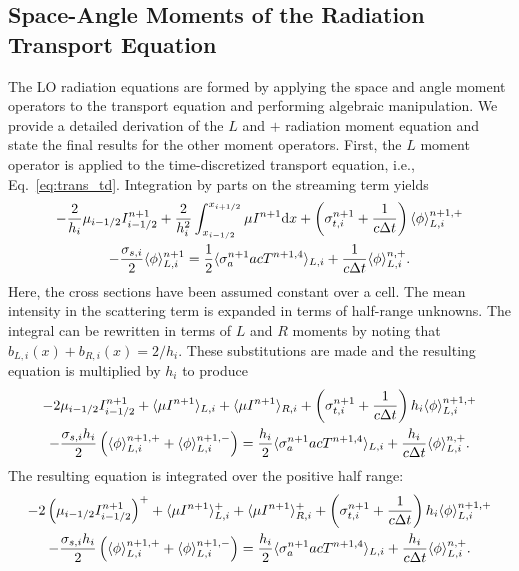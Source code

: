 \subsection{Space-Angle Moments of the Radiation Transport Equation}

The LO radiation equations are formed by applying the space and angle moment operators to the
transport equation and performing algebraic manipulation.  We provide a detailed
derivation of the $L$ and $+$ radiation moment equation and state the final results for the
other moment operators.  First, the $L$ moment operator is applied to the time-discretized transport equation,
i.e., Eq.~\eqref{eq:trans_td}.  Integration by parts on the streaming term yields
\begin{multline}
    -\frac{2}{h_i}{\mu}_{i-1/2} I_{i-1/2}^{n+1} + \frac{2}{h_i^2}\int_{{x_{i-1/2}}}^{{x_{i+1/2}}} \mu I^{n+1} \mathrm{d} x
        +  \left(\sigma_{t,i}^{n+1}+\frac{1}{c \Delta t} \right)  
        \langle \phi \rangle_{L,i}^{n+1,+} \\-  \frac{\sigma_{s,i} }{2} \langle \phi \rangle_{L,i}^{n+1} =
        \frac{1}{2} \langle \sigma_a^{n+1} a c T^{n+1,4} \rangle_{L,i} +
  \frac{1}{c\Delta t}\langle \phi \rangle_{L,i}^{n,+}.
\end{multline}
Here, the cross sections have been assumed constant over a cell.  The mean
intensity in the scattering term is expanded in terms of half-range unknowns.
The integral can be rewritten in terms of $L$ and $R$ moments by noting that $b_{L,i}(x) +
b_{R,i}(x) = 2/h_i$.  These substitutions are made and the resulting equation is
multiplied by $h_i$ to produce
\begin{multline}
    -2{\mu}_{i-1/2} I_{i-1/2}^{n+1} + \langle \mu I^{n+1} \rangle_{L,i} + \langle \mu I^{n+1} \rangle_{R,i} 
        +  \left(\sigma_{t,i}^{n+1}+\frac{1}{c \Delta t} \right) h_i 
  \langle \phi \rangle_{L,i}^{n+1,+} \\-  \frac{\sigma_{s,i} h_i}{2} \left( \langle \phi \rangle_{L,i}^{n+1,+} +
  \langle \phi \rangle_{L,i}^{n+1,-}\right) = \frac{h_i}{2} \langle \sigma_a^{n+1} a c T^{n+1,4} \rangle_{L,i} +
  \frac{h_i}{c\Delta t}\langle \phi \rangle_{L,i}^{n,+}.
\end{multline}
The resulting equation is integrated over the positive half range:
\begin{multline}\label{eq:spat_mom}
    -2\left({\mu}_{i-1/2} I_{i-1/2}^{n+1}\right)^+ + \langle \mu I^{n+1} \rangle^+_{L,i} + \langle \mu
        I^{n+1} \rangle^+_{R,i} 
        +  \left(\sigma_{t,i}^{n+1}+\frac{1}{c \Delta t} \right) h_i 
  \langle \phi \rangle_{L,i}^{n+1,+} \\-  \frac{\sigma_{s,i} h_i}{2} \left( \langle \phi \rangle_{L,i}^{n+1,+} +
  \langle \phi \rangle_{L,i}^{n+1,-}\right) = \frac{h_i}{2} \langle \sigma_a^{n+1} a c T^{n+1,4} \rangle_{L,i} +
  \frac{h_i}{c\Delta t}\langle \phi \rangle_{L,i}^{n,+}.
\end{multline}

